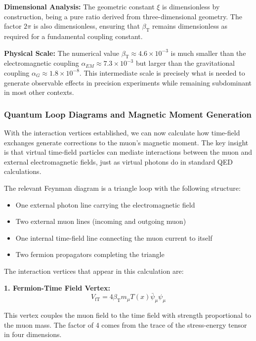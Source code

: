 \documentclass[12pt,a4paper]{article}
\newcommand{\Tfield}{T(x)}
\newcommand{\betaT}{\beta_{\text{T}}}
\newcommand{\xipar}{\xi}
\begin{document}
	\textbf{Dimensional Analysis:} The geometric constant $\xipar$ is dimensionless by construction, being a pure ratio derived from three-dimensional geometry. The factor $2\pi$ is also dimensionless, ensuring that $\betaT$ remains dimensionless as required for a fundamental coupling constant.
	
	\textbf{Physical Scale:} The numerical value $\betaT \approx 4.6 \times 10^{-3}$ is much smaller than the electromagnetic coupling $\alpha_{EM} \approx 7.3 \times 10^{-3}$ but larger than the gravitational coupling $\alpha_G \approx 1.8 \times 10^{-8}$. This intermediate scale is precisely what is needed to generate observable effects in precision experiments while remaining subdominant in most other contexts.
	
	\subsubsection{Quantum Loop Diagrams and Magnetic Moment Generation}
	
	With the interaction vertices established, we can now calculate how time-field exchanges generate corrections to the muon's magnetic moment. The key insight is that virtual time-field particles can mediate interactions between the muon and external electromagnetic fields, just as virtual photons do in standard QED calculations.
	
	The relevant Feynman diagram is a triangle loop with the following structure:
	\begin{itemize}
		\item One external photon line carrying the electromagnetic field
		\item Two external muon lines (incoming and outgoing muon)
		\item One internal time-field line connecting the muon current to itself
		\item Two fermion propagators completing the triangle
	\end{itemize}
	
	The interaction vertices that appear in this calculation are:
	
	\textbf{1. Fermion-Time Field Vertex:}
	\begin{equation}
		V_{\text{fT}} = 4\betaT m_\mu \Tfield \bar{\psi}_\mu \psi_\mu
	\end{equation}
	
	This vertex couples the muon field to the time field with strength proportional to the muon mass. The factor of 4 comes from the trace of the stress-energy tensor in four dimensions.
	
\end{document}
